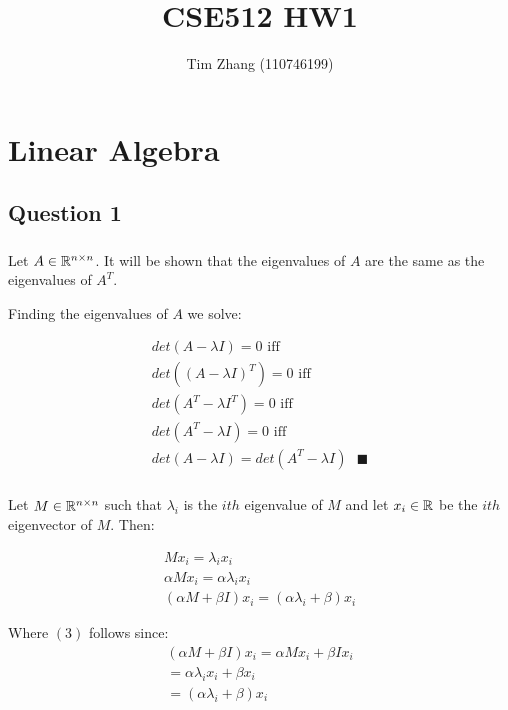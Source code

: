 \documentclass[11pt, oneside]{article}   	%
\title{CSE512 HW1}
\author{Tim Zhang (110746199)}
\date{}							%
\begin{document}
\maketitle

\section{Linear Algebra}
\subsection{Question 1}
\subsubsection{}
Let $A \in \Bbb R^{n \times n}$.  It will be shown that the eigenvalues of $A$ are the same as the eigenvalues of $A^T$.

Finding the eigenvalues of $A$ we solve:

\begin{gather*}
det(A - \lambda I) = 0 \text{ iff}\\
det((A - \lambda I)^T) = 0 \text{ iff}\\
det(A^T - \lambda I^T) = 0 \text{ iff}\\
det(A^T - \lambda I) = 0 \text{ iff}\\
det(A - \lambda I) = det(A^T - \lambda I) \text{ } \blacksquare
\end{gather*} 

\subsubsection{}
Let $M \in \Bbb R^{n \times n}$ such that $\lambda_i$ is the $ith$ eigenvalue of $M$ and let $x_i \in \Bbb R$ be the $ith$ eigenvector of $M$.  Then:

\begin{gather}
Mx_i = \lambda_i x_i \\
\alpha Mx_i = \alpha \lambda_ix_i\\
(\alpha M + \beta I)x_i = (\alpha \lambda_i + \beta)x_i
\end{gather}

Where $(3)$ follows since: 
\begin{gather*}
(\alpha M + \beta I)x_i = \alpha M x_i + \beta I x_i \\
= \alpha\lambda_i x_i + \beta x_i \\
= (\alpha\lambda_i + \beta)x_i
\end{gather*}
\end{document}
